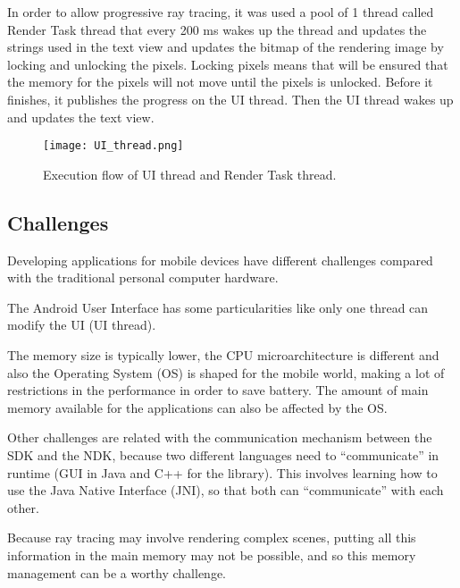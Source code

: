 \par
In order to allow progressive ray tracing, it was used a pool of 1 thread called Render Task thread that every 200 ms wakes up the thread and updates the strings used in the text view and updates the bitmap of the rendering image by locking and unlocking the pixels.
Locking pixels means that will be ensured that the memory for the pixels will not move until the pixels is unlocked.
Before it finishes, it publishes the progress on the UI thread.
Then the UI thread wakes up and updates the text view.

\begin{figure}[H]
	\centering
	\caption{Execution flow of UI thread and Render Task thread.}
	\label{Execution flow of UI thread and Render Task thread}
	\texttt{[image: UI\_thread.png]}
\end{figure}

\subsection{Challenges}

\par
Developing applications for mobile devices have different challenges compared with the traditional personal computer hardware.

\par
The Android User Interface has some particularities like only one thread can modify the UI (UI thread).

\par
The memory size is typically lower, the CPU microarchitecture is different and also the Operating System (OS) is shaped for the mobile world, making a lot of restrictions in the performance in order to save battery.
The amount of main memory available for the applications can also be affected by the OS.

\par
Other challenges are related with the communication mechanism between the SDK and the NDK, because two different languages need to “communicate” in runtime (GUI in Java and C++ for the library).
This involves learning how to use the Java Native Interface (JNI), so that both can “communicate” with each other.

\par
Because ray tracing may involve rendering complex scenes, putting all this information in the main memory may not be possible, and so this memory management can be a worthy challenge.